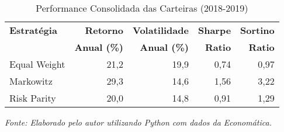 \begin{table}[H]
\centering
\caption{Performance Consolidada das Carteiras (2018-2019)}
\begin{tabular}{|l|r|r|r|r|}
\hline
\textbf{Estratégia} & \textbf{Retorno} & \textbf{Volatilidade} & \textbf{Sharpe} & \textbf{Sortino} \\
& \textbf{Anual (\%)} & \textbf{Anual (\%)} & \textbf{Ratio} & \textbf{Ratio} \\
\hline
Equal Weight & 21,2 & 19,9 & 0,74 & 0,97 \\
\hline
Markowitz & 29,3 & 14,6 & 1,56 & 3,22 \\
\hline
Risk Parity & 20,0 & 14,8 & 0,91 & 1,29 \\
\hline
\end{tabular}

\textit{Fonte: Elaborado pelo autor utilizando Python com dados da Economática.}
\label{tab:portfolio_performance}
\end{table}

